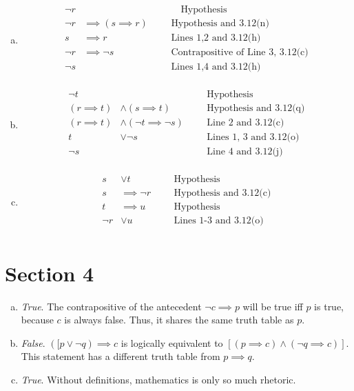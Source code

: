 \documentclass[12pt]{scrartcl} %
\begin{document}
\begin{enumerate}[(a)]
	\item \begin{align}
	\neg r & & & & \quad \text{Hypothesis}\tag{1}\\
	\neg r &\implies (s \implies r) & & & \text{Hypothesis and 3.12(n)}\tag{2}\\
	s &\implies r & & & \text{Lines 1,2 and 3.12(h)}\tag{3} \\
	\neg r &\implies \neg s & & & \text{Contrapositive of Line 3, 3.12(c)}\tag{4} \\
	\neg s & & & & \text{Lines 1,4 and 3.12(h)}\tag{5}\\ 
	\end{align}

	\item \begin{align}
	\neg t & & & & \text{Hypothesis}\tag{1} \\
	(r \implies t) &\land (s \implies t) & & & \text{Hypothesis and 3.12(q)}\tag{2}\\
	(r \implies t) &\land (\neg t \implies \neg s) & & & \text{Line 2 and 3.12(c)}\tag{3}\\
	t &\lor \neg s & & & \text{Lines 1, 3 and 3.12(o)}\tag{4} \\
	\neg s & & & & \text{Line 4 and 3.12(j)}\tag{5} \\ 
	\end{align}
	
	\item \begin{align}
	s &\lor t & & & \text{Hypothesis}\tag{1} \\
	s &\implies \neg r & & & \text{Hypothesis and 3.12(c)}\tag{2}\\
	t &\implies u & & & \text{Hypothesis}\tag{3}\\
	\neg r &\lor u & & & \text{Lines 1-3 and 3.12(o)}\tag{4} \\
	\end{align}
\end{enumerate}

\section{Section 4}
\begin{enumerate}[(a)]
	\item \emph{True}. The contrapositive of the antecedent $\neg c \implies p$ will be true iff $p$ is true, because $c$ is always false. Thus, it shares the same truth table as $p$.
	\item \emph{False}. $([p \lor \neg q) \implies c$ is logically equivalent to $[(p \implies c) \land (\neg q \implies c)]$. This statement has a different truth table from $p \implies q$.
	\item \emph{True}. Without definitions, mathematics is only so much rhetoric.
\end{enumerate}
\end{document}
